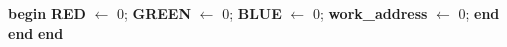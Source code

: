 \begin{algorithm}[H]
\begin{algorithmic}[1]
		\State \hspace{\algorithmicindent}\hspace{\algorithmicindent}\hspace{\algorithmicindent}\hspace{\algorithmicindent}\textbf{begin}
		\State \hspace{\algorithmicindent}\hspace{\algorithmicindent}\hspace{\algorithmicindent}\hspace{\algorithmicindent}\textbf{RED} $\gets$ 0;
		\State \hspace{\algorithmicindent}\hspace{\algorithmicindent}\hspace{\algorithmicindent}\hspace{\algorithmicindent}\textbf{GREEN} $\gets$ 0;
		\State \hspace{\algorithmicindent}\hspace{\algorithmicindent}\hspace{\algorithmicindent}\hspace{\algorithmicindent}\textbf{BLUE} $\gets$ 0;
		\State \hspace{\algorithmicindent}\hspace{\algorithmicindent}\hspace{\algorithmicindent}\hspace{\algorithmicindent}\textbf{work\_address} $\gets$ 0;
		\State \hspace{\algorithmicindent}\hspace{\algorithmicindent}\hspace{\algorithmicindent}\textbf{end}
		\State \hspace{\algorithmicindent}\textbf{end}
		\State \textbf{end}
		\EndProcedure
		\end{algorithmic}
	\end{algorithm}

